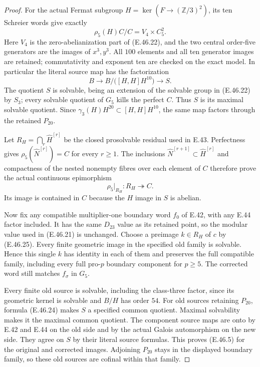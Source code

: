 \begin{proof}
For the actual Fermat subgroup
$H=\ker(F\to(\mathbb Z/3)^2)$, its ten Schreier words
give exactly
\[
                \rho_5(H)C/C=V_4\times C_5^2.
 \tag{E.46.23}
\]
Here $V_4$ is the zero-abelianization part of
\textup{(E.46.22)}, and the two central order-five
generators are the images of $x^3,y^3$.
All $100$ elements and all ten generator images are
retained; commutativity and exponent ten are checked
on the exact model.  In particular the literal source
map has the factorization
\[
 B\longrightarrow B/\bigl([H,H]H^{10}\bigr)
                     \longrightarrow S.
 \tag{E.46.24}
\]
The quotient $S$ is solvable, being an extension of
the solvable group in \textup{(E.46.22)} by $S_3$;
every solvable quotient of $G_5$ kills the perfect $C$.
Thus $S$ is its maximal solvable quotient.
Since $\gamma_3(H)H^{20}\subset[H,H]H^{10}$,
the same map factors through the retained $P_{20}$.

Let $R_H=\bigcap_r\widehat H^{[r]}$ be the closed
prosolvable residual used in E.43.  Perfectness gives
$\rho_5(\widehat N^{[r]})=C$ for every $r\ge1$.
The inclusions
$\widehat N^{[r+1]}\subset\widehat H^{[r]}$ and
compactness of the nested nonempty fibres over each
element of $C$ therefore prove the actual continuous
epimorphism
\[
                         \rho_5|_{R_H}:R_H\twoheadrightarrow C.
 \tag{E.46.25}
\]
Its image is contained in $C$ because the $H$ image
in $S$ is abelian.

Now fix any compatible multiplier-one boundary word
$f_0$ of E.42, with any E.44 factor included.
It has the same $D_{23}$ value as its retained point,
so the modular value used in \textup{(E.46.21)} is unchanged.
Choose a preimage $k\in R_H$ of $c$ by
\textup{(E.46.25)}.  Every finite geometric image in
the specified old family is solvable.  Hence this
single $k$ has identity in each of them and preserves
the full compatible family, including every full
pro-$p$ boundary component for $p\ge5$.
The corrected word still matches $f_\sigma$ in $G_5$.

Every finite old source is solvable, including the
class-three factor, since its geometric kernel is
solvable and $B/H$ has order $54$.
For old sources retaining $P_{20}$, formula
\textup{(E.46.24)} makes $S$ a specified common quotient.
Maximal solvability makes it the maximal common quotient.
The component source maps are onto by E.42 and E.44
on the old side and by the actual Galois automorphism
on the new side.  They agree on $S$ by their literal
source formulas.  This proves \textup{(E.46.5)} for
the original and corrected images.  Adjoining $P_{20}$
stays in the displayed boundary family, so these old
sources are cofinal within that family.


\end{proof}
